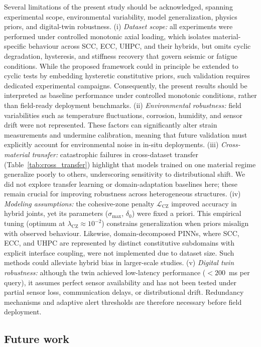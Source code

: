 \documentclass{article}
\begin{document}
Several limitations of the present study should be acknowledged, spanning experimental scope, environmental variability, model generalization, physics priors, and digital-twin robustness. 
(i) \emph{Dataset scope:} all experiments were performed under controlled monotonic axial loading, which isolates material-specific behaviour across SCC, ECC, UHPC, and their hybrids, but omits cyclic degradation, hysteresis, and stiffness recovery that govern seismic or fatigue conditions. While the proposed framework could in principle be extended to cyclic tests by embedding hysteretic constitutive priors, such validation requires dedicated experimental campaigns. Consequently, the present results should be interpreted as baseline performance under controlled monotonic conditions, rather than field-ready deployment benchmarks.
(ii) \emph{Environmental robustness:} field variabilities such as temperature fluctuations, corrosion, humidity, and sensor drift were not represented. These factors can significantly alter strain measurements and undermine calibration, meaning that future validation must explicitly account for environmental noise in in-situ deployments. 
(iii) \emph{Cross-material transfer:} catastrophic failures in cross-dataset transfer (Table~\ref{tab:cross_transfer}) highlight that models trained on one material regime generalize poorly to others, underscoring sensitivity to distributional shift. We did not explore transfer learning or domain-adaptation baselines here; these remain crucial for improving robustness across heterogeneous structures. 
(iv) \emph{Modeling assumptions:} the cohesive-zone penalty $\mathcal{L}_{\mathrm{CZ}}$ improved accuracy in hybrid joints, yet its parameters ($\sigma_{\max}$, $\delta_0$) were fixed a priori. This empirical tuning (optimum at $\lambda_{\mathrm{CZ}} \approx 10^{-2}$) constrains generalization when priors misalign with observed behaviour. Likewise, domain-decomposed PINNs, where SCC, ECC, and UHPC are represented by distinct constitutive subdomains with explicit interface coupling, were not implemented due to dataset size. Such methods could alleviate hybrid bias in larger-scale studies. 
(v) \emph{Digital twin robustness:} although the twin achieved low-latency performance ($<200$~ms per query), it assumes perfect sensor availability and has not been tested under partial sensor loss, communication delays, or distributional drift. Redundancy mechanisms and adaptive alert thresholds are therefore necessary before field deployment.


\subsection{Future work}
\label{sec:Future}
\end{document}
